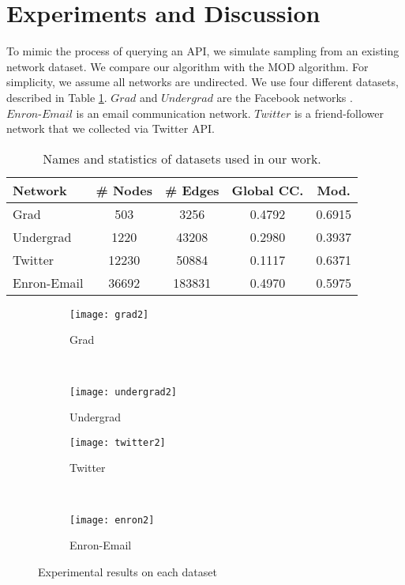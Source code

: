 \section{Experiments and Discussion}

To mimic the process of querying an API, we simulate sampling from an existing network dataset. We compare our algorithm with the MOD algorithm\cite{avrachenkov2014pay}. For simplicity, we assume all networks are undirected. We use four different datasets, described in Table \ref{tab:dataset}. $\textit{Grad}$ and $\textit{Undergrad}$ are the Facebook networks \cite{mislove2010you}. $\textit{Enron-Email}$ is an email communication network. $Twitter$ is a friend-follower network that we collected via Twitter API.

\begin{table}
\centering
 	\caption{Names and statistics of datasets used in our work.}
 	\label{tab:dataset} 
    \begin{tabular}{ l | c | c | c | c }
    \hline
	 Network & \# Nodes & \# Edges & Global CC. & Mod. \\ \hline
	 Grad & 503 & 3256 & 0.4792 & 0.6915 \\
	 Undergrad & 1220 & 43208 & 0.2980 & 0.3937 \\
	 Twitter & 12230 & 50884 & 0.1117 & 0.6371 \\
	 Enron-Email & 36692 & 183831 & 0.4970 & 0.5975 \\ \hline
    \end{tabular}
   
\end{table}

\begin{figure}[h]
 	\centering
    \begin{subfigure}[t]{0.25\textwidth}
        \centering
        \texttt{[image: grad2]}
        \caption{Grad}
    \end{subfigure}%
    ~ 
    \begin{subfigure}[t]{0.25\textwidth}
        \centering
        \texttt{[image: undergrad2]}
        \caption{Undergrad}
    \end{subfigure}
     \begin{subfigure}[t]{0.25\textwidth}
        \centering
        \texttt{[image: twitter2]}
        \caption{Twitter}
    \end{subfigure}%
    ~ 
    \begin{subfigure}[t]{0.25\textwidth}
        \centering
        \texttt{[image: enron2]}
        \caption{Enron-Email}
    \end{subfigure}
   	 \caption{Experimental results on each dataset}\label{fig:result}
\end{figure}

